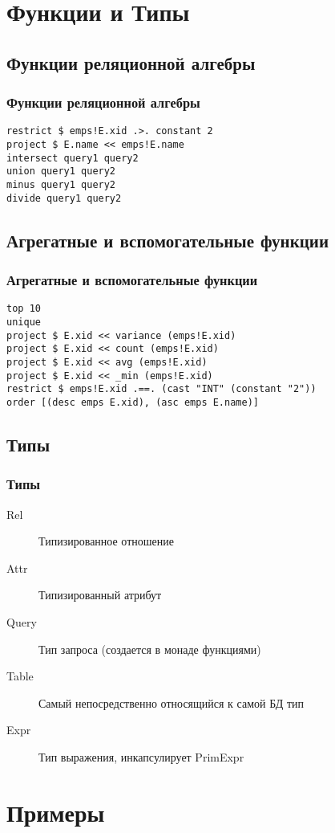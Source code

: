 \documentclass[12pt]{beamer}
\begin{document}
\section{Функции и Типы}
\subsection{Функции реляционной алгебры}
\begin{frame}[fragile]
\frametitle{Функции реляционной алгебры}
\begin{lstlisting}
restrict $ emps!E.xid .>. constant 2
project $ E.name << emps!E.name
intersect query1 query2
union query1 query2
minus query1 query2
divide query1 query2
\end{lstlisting}
\end{frame}

\subsection{Агрегатные и вспомогательные функции}
\begin{frame}[fragile]
\frametitle{Агрегатные и вспомогательные функции}
\begin{lstlisting}
top 10
unique
project $ E.xid << variance (emps!E.xid)
project $ E.xid << count (emps!E.xid)
project $ E.xid << avg (emps!E.xid)
project $ E.xid << _min (emps!E.xid)
restrict $ emps!E.xid .==. (cast "INT" (constant "2"))
order [(desc emps E.xid), (asc emps E.name)]
\end{lstlisting}
\end{frame}

\subsection{Типы}
\begin{frame}[fragile]
\frametitle{Типы}
\begin{description}
\item[Rel] Типизированное отношение
\item[Attr] Типизированный атрибут
\item[Query] Тип запроса (создается в монаде функциями)
\item[Table] Самый непосредственно относящийся к самой БД тип
\item[Expr] Тип выражения, инкапсулирует PrimExpr
\end{description}
\end{frame}

\section{Примеры}
\end{document}
